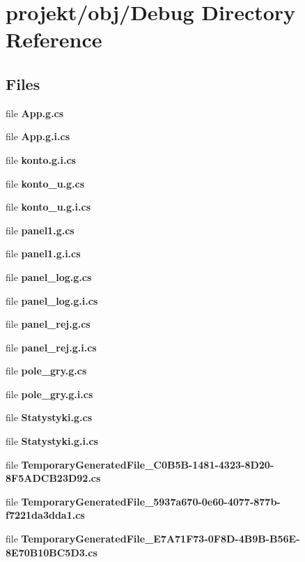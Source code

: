 \section{projekt/obj/\+Debug Directory Reference}
\label{dir_01a5f45df460297368f6678841e6a435}
\subsection*{Files}
\begin{DoxyCompactItemize}
\item 
file \textbf{ App.\+g.\+cs}
\item 
file \textbf{ App.\+g.\+i.\+cs}
\item 
file \textbf{ konto.\+g.\+i.\+cs}
\item 
file \textbf{ konto\+\_\+u.\+g.\+cs}
\item 
file \textbf{ konto\+\_\+u.\+g.\+i.\+cs}
\item 
file \textbf{ panel1.\+g.\+cs}
\item 
file \textbf{ panel1.\+g.\+i.\+cs}
\item 
file \textbf{ panel\+\_\+log.\+g.\+cs}
\item 
file \textbf{ panel\+\_\+log.\+g.\+i.\+cs}
\item 
file \textbf{ panel\+\_\+rej.\+g.\+cs}
\item 
file \textbf{ panel\+\_\+rej.\+g.\+i.\+cs}
\item 
file \textbf{ pole\+\_\+gry.\+g.\+cs}
\item 
file \textbf{ pole\+\_\+gry.\+g.\+i.\+cs}
\item 
file \textbf{ Statystyki.\+g.\+cs}
\item 
file \textbf{ Statystyki.\+g.\+i.\+cs}
\item 
file \textbf{ Temporary\+Generated\+File\+\_\+C0\+B5\+B-\/1481-\/4323-\/8\+D20-\/8\+F5\+A\+D\+C\+B23\+D92.\+cs}
\item 
file \textbf{ Temporary\+Generated\+File\+\_\+5937a670-\/0e60-\/4077-\/877b-\/f7221da3dda1.\+cs}
\item 
file \textbf{ Temporary\+Generated\+File\+\_\+\+E7\+A71\+F73-\/0\+F8\+D-\/4\+B9\+B-\/\+B56\+E-\/8\+E70\+B10\+B\+C5\+D3.\+cs}
\end{DoxyCompactItemize}
